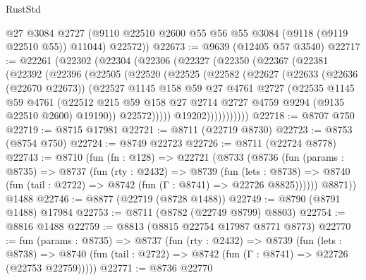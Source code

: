 \begin{lexlean}{RustStd}
\begin{coremodule}
        @27
        @3084
        @2727
        (@9110 @22510 @2600 @55 @56 @55 @3084 (@9118 (@9119 @22510 @55)) @11044)
        @22572))
@22673 := @9639 (@12405 @57 @3540)
@22717 := @22261
    (@22302
      (@22304
        (@22306
          (@22327
            (@22350
              (@22367
                (@22381
                  (@22392
                    (@22396
                      (@22505
                        (@22520
                          (@22525
                            (@22582
                              (@22627
                                (@22633
                                  (@22636 (@22670 @22673))
                                  (@22527
                                    @1145
                                    @158
                                    @59
                                    @27
                                    @4761
                                    @2727
                                    (@22535
                                      @1145
                                      @59
                                      @4761
                                      (@22512
                                        @215
                                        @59
                                        @158
                                        @27
                                        @2714
                                        @2727
                                        @4759
                                        @9294
                                        (@9135 @22510 @2600)
                                        @19190))
                                    @22572)))))
                          @19202)))))))))))
@22718 := @8707 @750
@22719 := @8715 @17981
@22721 := @8711 (@22719 @8730)
@22723 := @8753 (@8754 @750)
@22724 := @8749 @22723
@22726 := @8711 (@22724 @8778)
@22743 := @8710
    (fun (fn : @128) =>
    @22721
      (@8733
        (@8736
          (fun (params : @8735) =>
          @8737
            (fun (rty : @2432) =>
            @8739
              (fun (lets : @8738) =>
              @8740 (fun (tail : @2722) => @8742 (fun (Γ : @8741) => @22726 @8825))))))
        @8871))
    @1488
@22746 := @8877 (@22719 (@8728 @1488))
@22749 := @8790 (@8791 @1488) @17984
@22753 := @8711 (@8782 (@22749 @8799) @8803)
@22754 := @8816 @1488
@22759 := @8813 (@8815 @22754 @17987 @8771 @8773)
@22770 := fun (params : @8735) =>
  @8737
    (fun (rty : @2432) =>
    @8739
      (fun (lets : @8738) =>
      @8740 (fun (tail : @2722) => @8742 (fun (Γ : @8741) => @22726 (@22753 @22759)))))
@22771 := @8736 @22770

\end{coremodule}
\end{lexlean}
